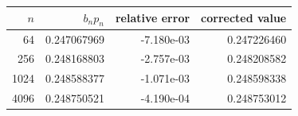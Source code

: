 \begin{tabular}{rrrr}
\toprule
$n$ & $b_n p_n$ & relative error & corrected value \\
\midrule
64 & 0.247067969 & -7.180e-03 & 0.247226460 \\
256 & 0.248168803 & -2.757e-03 & 0.248208582 \\
1024 & 0.248588377 & -1.071e-03 & 0.248598338 \\
4096 & 0.248750521 & -4.190e-04 & 0.248753012 \\
\bottomrule
\end{tabular}
